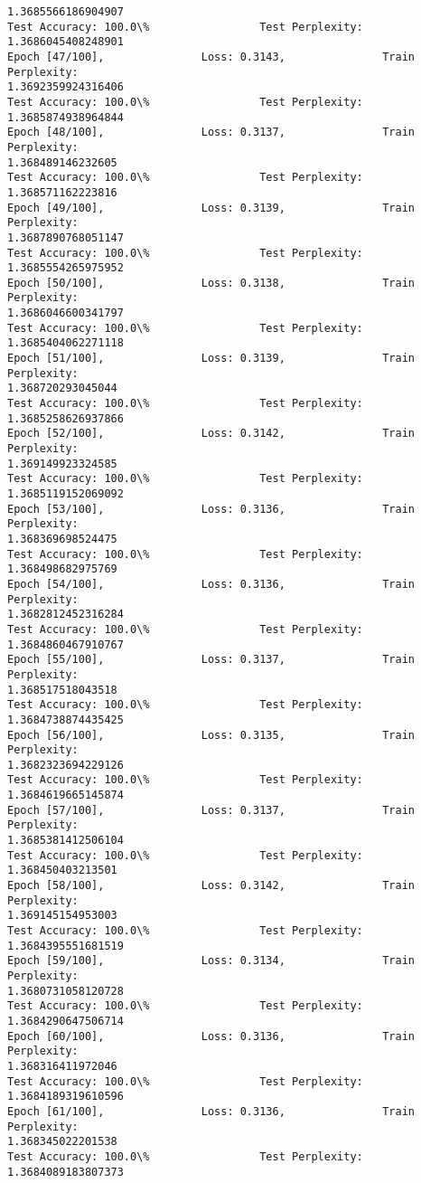 \documentclass[11pt]{article}
\begin{document}
\begin{Verbatim}[commandchars=\\\{\}]
1.3685566186904907
Test Accuracy: 100.0\%                 Test Perplexity: 1.3686045408248901
Epoch [47/100],               Loss: 0.3143,               Train Perplexity:
1.3692359924316406
Test Accuracy: 100.0\%                 Test Perplexity: 1.3685874938964844
Epoch [48/100],               Loss: 0.3137,               Train Perplexity:
1.368489146232605
Test Accuracy: 100.0\%                 Test Perplexity: 1.368571162223816
Epoch [49/100],               Loss: 0.3139,               Train Perplexity:
1.3687890768051147
Test Accuracy: 100.0\%                 Test Perplexity: 1.3685554265975952
Epoch [50/100],               Loss: 0.3138,               Train Perplexity:
1.3686046600341797
Test Accuracy: 100.0\%                 Test Perplexity: 1.3685404062271118
Epoch [51/100],               Loss: 0.3139,               Train Perplexity:
1.368720293045044
Test Accuracy: 100.0\%                 Test Perplexity: 1.3685258626937866
Epoch [52/100],               Loss: 0.3142,               Train Perplexity:
1.369149923324585
Test Accuracy: 100.0\%                 Test Perplexity: 1.3685119152069092
Epoch [53/100],               Loss: 0.3136,               Train Perplexity:
1.368369698524475
Test Accuracy: 100.0\%                 Test Perplexity: 1.368498682975769
Epoch [54/100],               Loss: 0.3136,               Train Perplexity:
1.3682812452316284
Test Accuracy: 100.0\%                 Test Perplexity: 1.3684860467910767
Epoch [55/100],               Loss: 0.3137,               Train Perplexity:
1.368517518043518
Test Accuracy: 100.0\%                 Test Perplexity: 1.3684738874435425
Epoch [56/100],               Loss: 0.3135,               Train Perplexity:
1.3682323694229126
Test Accuracy: 100.0\%                 Test Perplexity: 1.3684619665145874
Epoch [57/100],               Loss: 0.3137,               Train Perplexity:
1.3685381412506104
Test Accuracy: 100.0\%                 Test Perplexity: 1.368450403213501
Epoch [58/100],               Loss: 0.3142,               Train Perplexity:
1.369145154953003
Test Accuracy: 100.0\%                 Test Perplexity: 1.3684395551681519
Epoch [59/100],               Loss: 0.3134,               Train Perplexity:
1.3680731058120728
Test Accuracy: 100.0\%                 Test Perplexity: 1.3684290647506714
Epoch [60/100],               Loss: 0.3136,               Train Perplexity:
1.368316411972046
Test Accuracy: 100.0\%                 Test Perplexity: 1.3684189319610596
Epoch [61/100],               Loss: 0.3136,               Train Perplexity:
1.368345022201538
Test Accuracy: 100.0\%                 Test Perplexity: 1.3684089183807373

\end{Verbatim}
\end{document}
